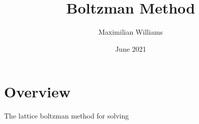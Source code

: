 \documentclass{article}
\title{Boltzman Method}
\author{Maximilian Williams}
\date{June 2021}
\begin{document}
\maketitle

\section*{Overview}
The lattice boltzman method for solving
\end{document}

